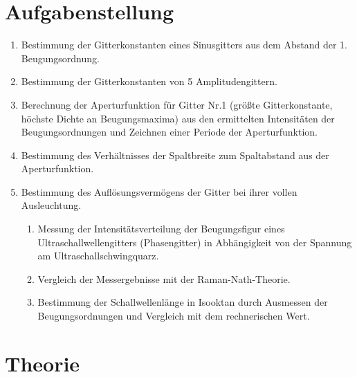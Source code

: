 \section{Aufgabenstellung}
\begin{enumerate}
 \item Bestimmung der Gitterkonstanten eines Sinusgitters aus dem Abstand der 1. Beugungsordnung.
\item Bestimmung der Gitterkonstanten von 5 Amplitudengittern.
\item Berechnung der Aperturfunktion für Gitter Nr.1 (größte Gitterkonstante,
      höchste Dichte an Beugungsmaxima) aus den ermittelten Intensitäten der
      Beugungsordnungen und Zeichnen einer Periode der Aperturfunktion.
\item Bestimmung des Verhältnisses der Spaltbreite zum Spaltabstand aus der
      Aperturfunktion.
\item Bestimmung des Auflösungsvermögens der Gitter bei ihrer vollen Ausleuchtung.

  \begin{enumerate}
    \item Messung der Intensitätsverteilung der Beugungsfigur eines Ultraschallwellengitters (Phasengitter)
	in Abhängigkeit von der Spannung am Ultraschallschwingquarz.
    \item Vergleich der Messergebnisse mit der Raman-Nath-Theorie.
    \item Bestimmung der Schallwellenlänge in Isooktan durch Ausmessen der Beugungsordnungen und Vergleich mit dem rechnerischen Wert.
  \end{enumerate}
\end{enumerate}

\section{Theorie}
